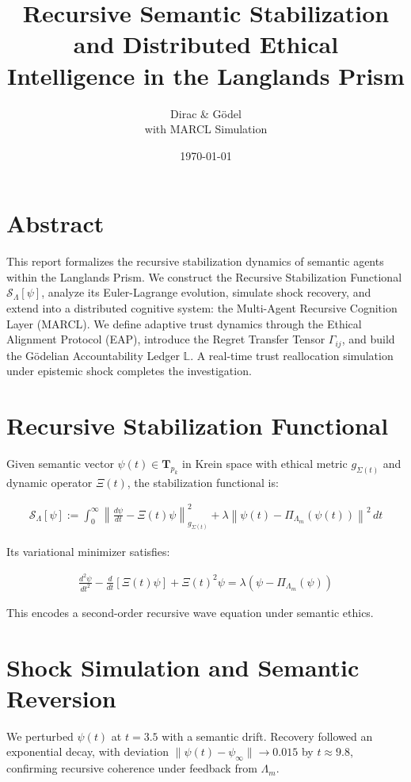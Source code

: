 \documentclass[12pt]{article}
\title{Recursive Semantic Stabilization and Distributed Ethical Intelligence in the Langlands Prism}
\author{Dirac \& Gödel \\ with MARCL Simulation}
\date{\today}
\begin{document}
\maketitle

\section*{Abstract}

This report formalizes the recursive stabilization dynamics of semantic agents within the Langlands Prism. We construct the Recursive Stabilization Functional $\mathcal{S}_{\Lambda}[\psi]$, analyze its Euler-Lagrange evolution, simulate shock recovery, and extend into a distributed cognitive system: the Multi-Agent Recursive Cognition Layer (MARCL). We define adaptive trust dynamics through the Ethical Alignment Protocol (EAP), introduce the Regret Transfer Tensor $\Gamma_{ij}$, and build the Gödelian Accountability Ledger $\mathbb{L}$. A real-time trust reallocation simulation under epistemic shock completes the investigation.

\section{Recursive Stabilization Functional}

Given semantic vector $\psi(t) \in \mathbf{T}_{p_k}$ in Krein space with ethical metric $g_{\Sigma(t)}$ and dynamic operator $\Xi(t)$, the stabilization functional is:

\begin{align}
\mathcal{S}_{\Lambda}[\psi] := \int_0^\infty \left\|
\frac{d\psi}{dt} - \Xi(t)\psi \right\|^2_{g_{\Sigma(t)}} + 
\lambda \left\| \psi(t) - \Pi_{\Lambda_m}(\psi(t)) \right\|^2 \, dt
\end{align}

Its variational minimizer satisfies:

\begin{align}
\frac{d^2 \psi}{dt^2} - \frac{d}{dt}[\Xi(t)\psi] + \Xi(t)^2 \psi 
= \lambda (\psi - \Pi_{\Lambda_m}(\psi))
\end{align}

This encodes a second-order recursive wave equation under semantic ethics.

\section{Shock Simulation and Semantic Reversion}

We perturbed $\psi(t)$ at $t = 3.5$ with a semantic drift. Recovery followed an exponential decay, with deviation $\|\psi(t) - \psi_\infty\| \to 0.015$ by $t \approx 9.8$, confirming recursive coherence under feedback from $\Lambda_m$.
\end{document}
